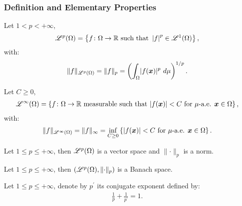 \subsubsection{Definition and Elementary Properties}

\begin{definition}
    Let $1 < p < +\infty$,
    \begin{gather}
        \mathscr{L}^{p}(\Omega) = \left\{ f \colon \Omega \rightarrow \mathbb{R} \text{ such that } \left| f \right|^p \in \mathscr{L}^{1}(\Omega) \right\},
    \end{gather}
    with:
    \begin{gather}
    \lVert f \rVert_{\mathscr{L}^{p}(\Omega)} = \lVert f \rVert_{p} = \left( \int_{\Omega} \lvert f(\bm{x}) \rvert^p ~ d \mu \right)^{1/p}.
    \end{gather}
\end{definition}

\begin{definition}[$\SpaceLp{\infty}(\Omega)$]
    Let $C \geq 0$,
    \begin{gather}
        \mathscr{L}^{\infty}(\Omega) = \left\{ f \colon \Omega \rightarrow \mathbb{R} \text{ measurable such that } \lvert f(\bm{x}) \rvert < C \text{ for } \mu \text{-a.e. } \bm{x} \in \Omega \right\},
    \end{gather}
    with:
    \begin{gather}
    \lVert f \rVert_{\mathscr{L}^{\infty}(\Omega)} = \lVert f \rVert_{\infty} = \inf_{C \geq 0} \left\{ \lvert f(\bm{x}) \rvert < C \text{ for } \mu \text{-a.e. } \bm{x} \in \Omega \right\}.
    \end{gather}
\end{definition}

\begin{theorem}
    Let $1 \leq p \leq +\infty$, then $\mathscr{L}^{p}(\Omega)$ is a vector space and $\lVert \cdot \rVert_p$ is a norm.
\end{theorem}

\begin{theorem}
    Let $1 \leq p \leq +\infty$, then $(\mathscr{L}^{p}(\Omega), \lVert \cdot \rVert_p)$ is a Banach space.
\end{theorem}

\begin{definition}
    Let $1 \leq p \leq +\infty$, denote by $p^{\prime}$ its conjugate exponent defined by:
    \begin{gather}
        \frac{1}{p} + \frac{1}{p^{\prime}} = 1.
    \end{gather}
\end{definition}

